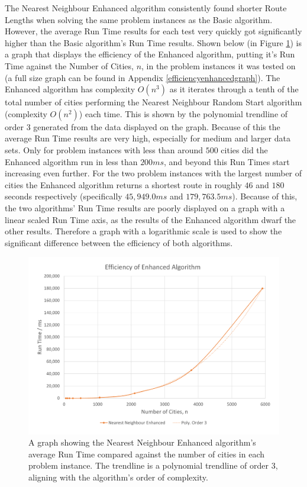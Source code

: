 \documentclass[conference,backref=page]{acmsiggraph}
\begin{document}
The Nearest Neighbour Enhanced algorithm consistently found shorter Route Lengths when solving the same problem instances as the Basic algorithm. However, the average Run Time results for each test very quickly got significantly higher than the Basic algorithm's Run Time results. Shown below (in Figure \ref{efficiencyenhancedcolumngraph}) is a graph that displays the efficiency of the Enhanced algorithm, putting it's Run Time against the Number of Cities, $n$, in the problem instances it was tested on (a full size graph can be found in Appendix \ref{efficiencyenhancedgraph}). The Enhanced algorithm has complexity $O(n^3)$ as it iterates through a tenth of the total number of cities performing the Nearest Neighbour Random Start algorithm (complexity $O(n^2)$) each time. This is shown by the polynomial trendline of order 3 generated from the data displayed on the graph. Because of this the average Run Time results are very high, especially for medium and larger data sets. Only for problem instances with less than around $500$ cities did the Enhanced algorithm run in less than $200ms$, and beyond this Run Times start increasing even further. For the two problem instances with the largest number of cities the Enhanced algorithm returns a shortest route in roughly $46$ and $180$ seconds respectively (specifically $45,949.0ms$ and $179,763.5ms$). Because of this, the two algorithms' Run Time results are poorly displayed on a graph with a linear scaled Run Time axis, as the results of the Enhanced algorithm dwarf the other results. Therefore a graph with a logarithmic scale is used to show the significant difference between the efficiency of both algorithms.

\begin{figure}[h]
	\includegraphics[width=\columnwidth]{images/efficiency_enhanced_column.pdf}
	\caption{A graph showing the Nearest Neighbour Enhanced algorithm's average Run Time compared against the number of cities in each problem instance. The trendline is a polynomial trendline of order 3, aligning with the algorithm's order of complexity.}
	\label{efficiencyenhancedcolumngraph}
\end{figure}
\end{document}
